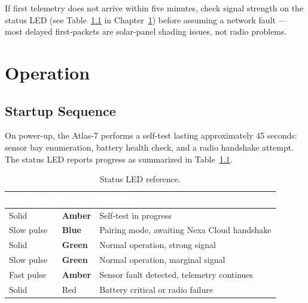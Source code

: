 \documentclass[11pt,a4paper,oneside,headings=big,chapterprefix=true]{scrreprt}
\begin{document}
\begin{tipbox}
If first telemetry does not arrive within five minutes, check signal strength on the status LED (see Table~\ref{tab:leds} in Chapter~\ref{ch:operation}) before assuming a network fault --- most delayed first-packets are solar-panel shading issues, not radio problems.
\end{tipbox}

\chapter{Operation}
\label{ch:operation}

\section{Startup Sequence}

On power-up, the Atlas-7 performs a self-test lasting approximately 45 seconds: sensor bay enumeration, battery health check, and a radio handshake attempt. The status LED reports progress as summarized in Table~\ref{tab:leds}.

\begin{table}[h]
\centering
\renewcommand{\arraystretch}{1.3}
\begin{tabularx}{\textwidth}{@{}l l X@{}}
\toprule
\rowcolor{steel}
\textcolor{white}{\bfseries LED State} & \textcolor{white}{\bfseries Color} & \textcolor{white}{\bfseries Meaning} \\
\midrule
Solid & \textcolor{amberaccent!80!black}{\bfseries Amber} & Self-test in progress \\
\rowcolor{fogbg}
Slow pulse & \textcolor{steel}{\bfseries Blue} & Pairing mode, awaiting Nexa Cloud handshake \\
Solid & \textcolor{steel}{\bfseries Green} & Normal operation, strong signal \\
\rowcolor{fogbg}
Slow pulse & \textcolor{steel}{\bfseries Green} & Normal operation, marginal signal \\
Fast pulse & \textcolor{amberaccent!80!black}{\bfseries Amber} & Sensor fault detected, telemetry continues \\
\rowcolor{fogbg}
Solid & Red & Battery critical or radio failure \\
\bottomrule
\end{tabularx}
\caption{Status LED reference.}
\label{tab:leds}
\end{table}
\end{document}
